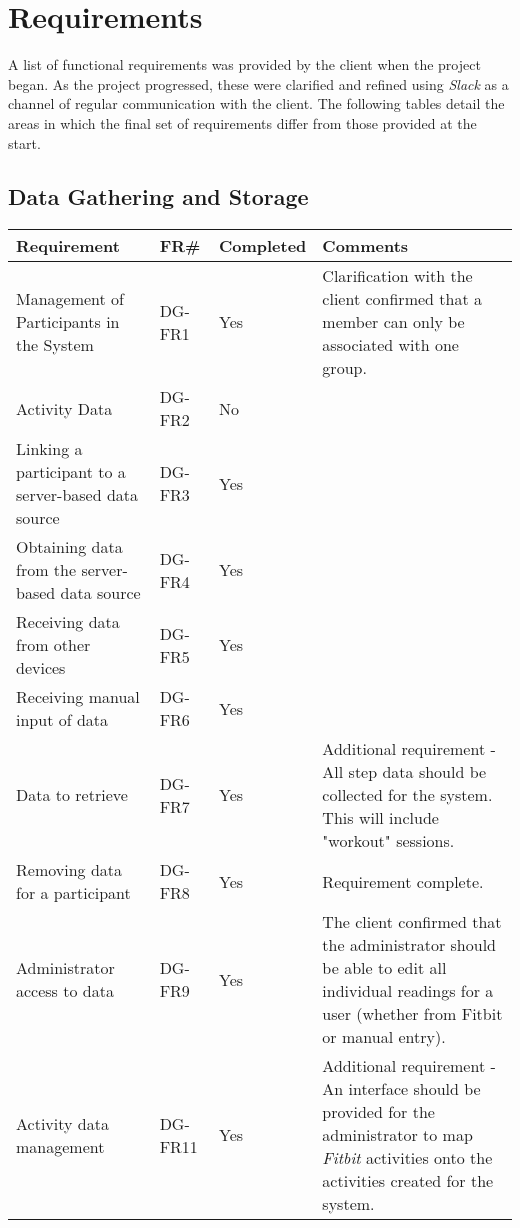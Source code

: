 \label{Requirements_chpt}
\chapter{Requirements}

A list of functional requirements was provided by the client when the project began. As the project progressed, these were clarified and refined using \textit{Slack}\cite{slack} as a channel of regular communication with the client. The following tables detail the areas in which the final set of requirements differ from those provided at the start.

\section{Data Gathering and Storage}
\begin{tabular}{ |p{5cm}|l|l|p{8cm}|}
\hline
\textbf{Requirement}	&	\textbf{FR\#}	&	\textbf{Completed}	&	\textbf{Comments} \\
\hline
Management of Participants in the System			& DG-FR1	& Yes	&  Clarification with the client confirmed that a member can only be associated with one group. \\
\hline
Activity Data										& DG-FR2	& No	&  \\
\hline
Linking a participant to a server-based data source	& DG-FR3	& Yes	&  \\
\hline
Obtaining data from the server-based data source	& DG-FR4	& Yes	&  \\
\hline
Receiving data from other devices					& DG-FR5	& Yes	&  \\
\hline
Receiving manual input of data						& DG-FR6	& Yes	&  \\
\hline
Data to retrieve 									& DG-FR7	& Yes	& Additional requirement - All step data should be collected for the system. This will include "workout" sessions. \\
\hline
Removing data for a participant						& DG-FR8	& Yes	&  Requirement complete. \\
\hline
Administrator access to data						& DG-FR9	& Yes	& The client confirmed that the administrator should be able to edit all individual readings for a user (whether from Fitbit or manual entry).\\
\hline
Activity data management							& DG-FR11	& Yes	& Additional requirement - An interface should be provided for the administrator to map \textit{Fitbit} activities onto the activities created for the system. \\
\hline
\end{tabular}

